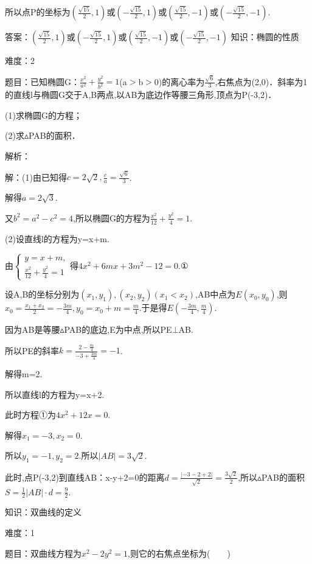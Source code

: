 \documentclass{article} %
\begin{document}
所以点P的坐标为$(\frac{\sqrt{15}}{2},1)$或$(-\frac{\sqrt{15}}{2},1)$或$(\frac{\sqrt{15}}{2},-1)$或$(-\frac{\sqrt{15}}{2},-1)$.

答案：$(\frac{\sqrt{15}}{2},1)$或$(-\frac{\sqrt{15}}{2},1)$或$(\frac{\sqrt{15}}{2},-1)$或$(-\frac{\sqrt{15}}{2},-1)$
知识：椭圆的性质

难度：2

题目：已知椭圆G：$\frac{x^2}{a^2}+\frac{y^2}{b^2}=1$(a${>}$b${>}$0)的离心率为$\frac{\sqrt{6}}{3}$,右焦点为(2,0)．斜率为1的直线l与椭圆G交于A,B两点,以AB为底边作等腰三角形,顶点为P(-3,2)．

(1)求椭圆G的方程；

(2)求${\vartriangle}$PAB的面积．

解析：

解：(1)由已知得$c=2\sqrt{2},\frac{c}{a}=\frac{\sqrt{6}}{3}$.

解得$a=2\sqrt{3}$.

又$b^{2}=a^{2}-c^{2}=4$,所以椭圆G的方程为$\frac{x^2}{12}+\frac{y^2}{4}=1$.

(2)设直线l的方程为y=x+m.

由$\left\{
\begin{array}{l}
y=x+m, \\
\frac{x^2}{12}+\frac{y^2}{4}=1
\end{array}
\right.$得$4x^{2}+6mx+3m^{2}-12=0$.①

设A,B的坐标分别为$(x_{1},y_{1}),(x_{2},y_{2})(x_{1}{<}x_{2})$,AB中点为$E(x_{0},y_{0})$,则$x_{0}=\frac{x_1+x_2}{2}=-\frac{3m}{4},y_{0}=x_{0}+m=\frac{m}{4}$.于是得$E(-\frac{3m}{4},\frac{m}{4})$.

因为AB是等腰${\vartriangle}$PAB的底边,E为中点,所以PE${\bot}$AB.

所以PE的斜率$k=\frac{2-\frac{m}{4}}{-3+\frac{3m}{4}}=-1$.

解得m=2.

所以直线l的方程为y=x+2.

此时方程①为$4x^{2}+12x=0$.

解得$x_{1}=-3,x_{2}=0$.

所以$y_{1}=-1,y_{2}=2$.所以$|AB|=3\sqrt{2}$.

此时,点P(-3,2)到直线AB：x-y+2=0的距离$d=\frac{|-3-2+2|}{\sqrt{2}}=\frac{3\sqrt{2}}{2}$,所以${\vartriangle}$PAB的面积$S=\frac{1}{2}|AB|\cdot d=\frac{9}{2}$.



知识：双曲线的定义

难度：1

题目：双曲线方程为$x^{2}-2y^{2}=1$,则它的右焦点坐标为(　　)
\end{document}
